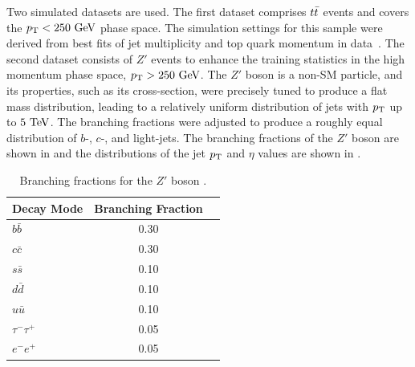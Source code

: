 Two simulated datasets are used.
The first dataset comprises $t\bar{t}$ events and covers the $\pt < 250~\GeV$ phase space.
The simulation settings for this sample were derived from best fits of jet multiplicity and top quark momentum in data~\cite{ttbar1, ttbar2}.
The second dataset consists of $Z'$ events to enhance the training statistics in the high momentum phase space, $\pt > 250~\GeV$.
The $Z'$ boson is a non-SM particle, and its properties, such as its cross-section, were precisely tuned to produce a flat mass distribution, leading to a relatively uniform distribution of jets with $p_{\text{T}}$ up to $5~\TeV$.
The branching fractions were adjusted to produce a roughly equal distribution of $b$-, $c$-, and light-jets.
The branching fractions of the $Z'$ boson are shown in  and the distributions of the jet $p_{\text{T}}$ and $\eta$ values are shown in .

\begin{table}[ht]
    \centering
    \begin{tabular}{lcc}
        \toprule
        Decay Mode & Branching Fraction \\
        \midrule
        $b\bar{b}$ & 0.30 \\
        $c\bar{c}$ & 0.30 \\
        $s\bar{s}$ & 0.10 \\
        $d\bar{d}$ & 0.10 \\
        $u\bar{u}$ & 0.10 \\
        $\tau^-\tau^+$ & 0.05 \\
        $e^-e^+$ & 0.05 \\
        \bottomrule
    \end{tabular}
    \caption{Branching fractions for the $Z'$ boson \cite{Run2FTAlgs}.}
    \label{tab:zprime_branching}
\end{table}

